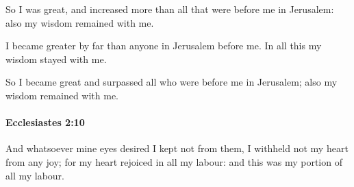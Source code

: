 			\begin{versebox}
					\item[BHS] 
					\item[LXX] 
					\item[ASV] So I was great, and increased more than all that were before me in Jerusalem: also my wisdom remained with me.
					\item[NIV] I became greater by far than anyone in Jerusalem before me. In all this my wisdom stayed with me.
					\item[NRSV] So I became great and surpassed all who were before me in Jerusalem; also my wisdom remained with me.
			\end{versebox}

		\paragraph{Ecclesiastes 2:10} %
			\label{ECCLESIASTES-2-10}

			And whatsoever mine eyes desired I kept not from them, I withheld not my heart from any joy; for my heart rejoiced in all my labour: and this was my portion of all my labour.

